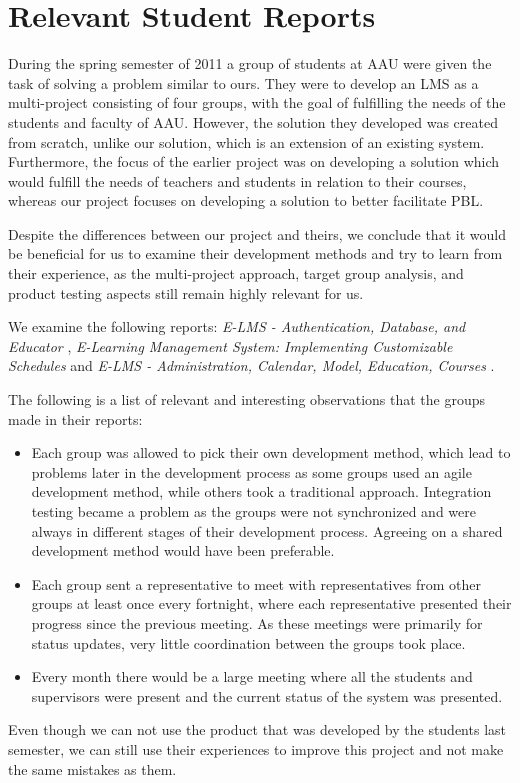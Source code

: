 \section{Relevant Student Reports}
\label{sec:prevwork}
During the spring semester of 2011 a group of students at AAU were given the task of solving a problem similar to ours. 
They were to develop an LMS as a multi-project consisting of four groups, with the goal of fulfilling the needs of the students and faculty of AAU.
However, the solution they developed was created from scratch, unlike our solution, which is an extension of an existing system.
Furthermore, the focus of the earlier project was on developing a solution which would fulfill the needs of teachers and students in relation to their courses, whereas our project focuses on developing a solution to better facilitate PBL. 

Despite the differences between our project and theirs, we conclude that it would be beneficial for us to examine their development methods and try to learn from their experience, as the multi-project approach, target group analysis, and product testing aspects still remain highly relevant for us. 

We examine the following reports: \emph{E-LMS - Authentication, Database, and Educator} \cite{E-LMS-ADE},  \emph{E-Learning Management System: Implementing Customizable Schedules} \cite{E-LMS-ICS} and \emph{E-LMS - Administration, Calendar, Model, Education, Courses} \cite{E-LMS-ACMEC}.

The following is a list of relevant and interesting observations that the groups made in their reports:
\begin{itemize}
	\item{Each group was allowed to pick their own development method, which lead to problems later in the development process as some groups used an agile development method, while others took a traditional approach. 
	Integration testing became a problem as the groups were not synchronized and were always in different stages of their development process. 
	Agreeing on a shared development method would have been preferable.}
	\item{Each group sent a representative to meet with representatives from other groups at least once every fortnight, where each representative presented their progress since the previous meeting. 
	As these meetings were primarily for status updates, very little coordination between the groups took place.}
	\item{Every month there would be a large meeting where all the students and supervisors were present and the current status of the system was presented.}
\end{itemize}

Even though we can not use the product that was developed by the students last semester, we can still use their experiences to improve this project and not make the same mistakes as them.
